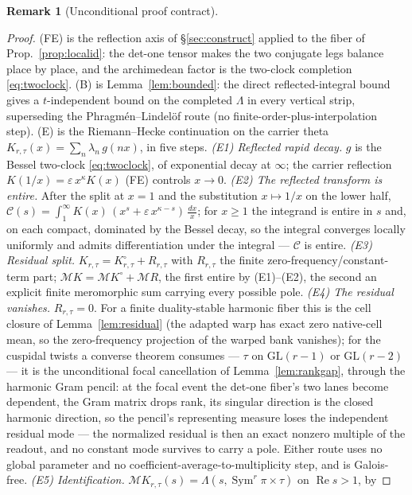\documentclass[11pt]{article}
\theoremstyle{definition}
\newtheorem{remark}[theorem]{Remark}
\renewcommand{\Re}{\operatorname{Re}}
\newcommand{\Sym}{\operatorname{Sym}}
\begin{document}
\begin{remark}[Unconditional proof contract]
\begin{enumerate}
\begin{proof}
\textup{(FE)} is the reflection axis of \S\ref{sec:construct} applied to the fiber of
Prop.~\ref{prop:localid}: the det-one tensor makes the two conjugate legs balance place by place, and the
archimedean factor is the two-clock completion \eqref{eq:twoclock}. \textup{(B)} is Lemma~\ref{lem:bounded}: the direct reflected-integral bound gives a $t$-independent bound on the completed $\Lambda$ in every vertical strip, superseding the Phragm\'en--Lindel\"of route (no finite-order-plus-interpolation step).
\textup{(E)} is the Riemann--Hecke continuation on the carrier theta $K_{r,\tau}(x)=\sum_n\lambda_n\,g(nx)$,
in five steps.
\emph{(E1) Reflected rapid decay.} $g$ is the Bessel two-clock \eqref{eq:twoclock}, of exponential decay at
$\infty$; the carrier reflection $K(1/x)=\varepsilon\,x^{\kappa}K(x)$ \textup{(FE)} controls $x\to0$.
\emph{(E2) The reflected transform is entire.} After the split at $x=1$ and the substitution $x\mapsto1/x$
on the lower half, $\mathcal C(s)=\int_1^\infty K(x)\,(x^{s}+\varepsilon\,x^{\kappa-s})\,\tfrac{dx}{x}$; for
$x\ge1$ the integrand is entire in $s$ and, on each compact, dominated by the Bessel decay, so the integral
converges locally uniformly and admits differentiation under the integral --- $\mathcal C$ is entire.
\emph{(E3) Residual split.} $K_{r,\tau}=K^\circ_{r,\tau}+R_{r,\tau}$ with $R_{r,\tau}$ the finite
zero-frequency/constant-term part; $\mathcal M K=\mathcal M K^\circ+\mathcal M R$, the first entire by
\textup{(E1)--(E2)}, the second an explicit finite meromorphic sum carrying every possible pole.
\emph{(E4) The residual vanishes.} $R_{r,\tau}=0$. For a finite duality-stable harmonic fiber this is the
cell closure of Lemma~\ref{lem:residual} (the adapted warp has exact zero native-cell mean, so the
zero-frequency projection of the warped bank vanishes); for the cuspidal twists a converse theorem consumes
--- $\tau$ on $\mathrm{GL}(r-1)$ or $\mathrm{GL}(r-2)$ --- it is the unconditional focal cancellation of
Lemma~\ref{lem:rankgap}, through the harmonic Gram pencil: at the focal event the det-one fiber's two lanes
become dependent, the Gram matrix drops rank, its singular direction is the closed harmonic direction, so the
pencil's representing measure loses the independent residual mode --- the normalized residual is then an exact
nonzero multiple of the readout, and no constant mode survives to carry a pole. Either route uses no global
parameter and no coefficient-average-to-multiplicity step, and is Galois-free.
\emph{(E5) Identification.} $\mathcal M K_{r,\tau}(s)=\Lambda(s,\Sym^r\pi\times\tau)$ on $\Re s>1$, by

\end{proof}
\end{enumerate}
\end{remark}
\end{document}
